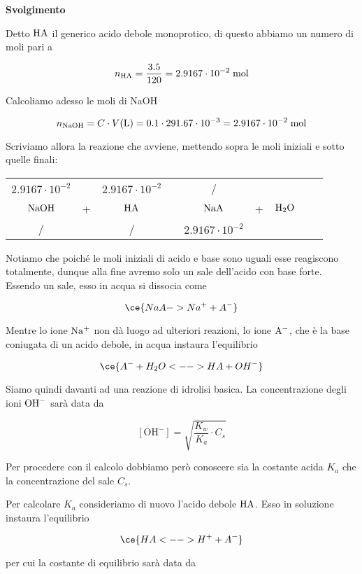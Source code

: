 \vspace{0.2cm}\large\textbf{Svolgimento}\normalsize

\vspace{0.2cm}Detto $\rm HA$ il generico acido debole monoprotico, di questo abbiamo un numero di moli pari a

$$n_{\rm HA}
=\frac{3.5}{120}=2.9167 \cdot 10^{-2} \; \rm mol$$

Calcoliamo adesso le moli di NaOH

$$n_{\rm NaOH}
=C \cdot V(\text{L})=0.1 \cdot 291.67 \cdot 10^{-3}
=2.9167 \cdot 10^{-2} \; \rm mol$$

Scriviamo allora la reazione che avviene, mettendo sopra le moli iniziali e sotto quelle finali:

\begin{center}
    \begin{tabular}{ccccccccc}
        $2.9167 \cdot 10^{-2}$ & & $2.9167 \cdot 10^{-2}$ & & / & &\\
        $\rm NaOH$ & + & $\rm HA$ & \ce{<-->} & $\rm NaA$ & + & $\rm H_2O$\\
        / & & / & & $2.9167 \cdot 10^{-2}$ & &\\
    \end{tabular}
\end{center}

Notiamo che poiché le moli iniziali di acido e base sono uguali esse reagiscono totalmente, dunque alla fine avremo solo un sale dell'acido con base forte. Essendo un sale, esso in acqua si dissocia come

$$\ce{NaA -> Na^+ + A^-}$$

Mentre lo ione $\rm Na^+$ non dà luogo ad ulteriori reazioni, lo ione $\rm A^-$, che è la base coniugata di un acido debole, in acqua instaura l'equilibrio

$$\ce{A^- + H_2O <--> HA + OH^-}$$

Siamo quindi davanti ad una reazione di idrolisi basica. La concentrazione degli ioni $\rm OH^-$ sarà data da

$$[\text{OH}^-]
=\sqrt{\frac{K_w}{K_a}\cdot C_s}$$

Per procedere con il calcolo dobbiamo però conoscere sia la costante acida $K_a$ che la concentrazione del sale $C_s$.

Per calcolare $K_a$ consideriamo di nuovo l'acido debole $\rm HA$. Esso in soluzione instaura l'equilibrio

$$\ce{HA <--> H^+ + A^-}$$

per cui la costante di equilibrio sarà data da

